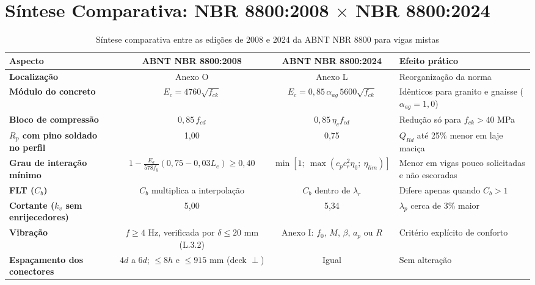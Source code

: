 \section{Síntese Comparativa: NBR 8800:2008 \ensuremath{\times} NBR 8800:2024}\label{sec:2.10}

\begin{table}[htbp]
  \centering
  \caption{Síntese comparativa entre as edições de 2008 e 2024 da ABNT NBR 8800 para vigas mistas}\label{tab:comparativo-edicoes}
  {\footnotesize
  \renewcommand{\arraystretch}{1.3}
  \begin{tabularx}{\textwidth}{@{}>{\raggedright\arraybackslash}p{2.6cm}CCL@{}}
  \toprule
  Aspecto & ABNT NBR 8800:2008 & ABNT NBR 8800:2024 & Efeito prático \\
  \midrule
  \textbf{Localização} & Anexo O & Anexo L & Reorganização da norma \\
  \textbf{Módulo do concreto} & $E_c = 4760\sqrt{f_{ck}}$ & $E_c = 0{,}85\,\alpha_{ag}\, 5600\sqrt{f_{ck}}$ & Idênticos para granito e gnaisse ($\alpha_{ag} = 1{,}0$) \\
  \textbf{Bloco de compressão} & $0{,}85\, f_{cd}$ & $0{,}85\,\eta_c f_{cd}$ & Redução só para $f_{ck} > 40$ MPa \\
  \textbf{$R_p$ com pino soldado no perfil} & 1,00 & 0,75 & $Q_{Rd}$ até 25\% menor em laje maciça \\
  \textbf{Grau de interação mínimo} & $1 - \frac{E_a}{578 f_y}(0{,}75 - 0{,}03L_e) \ge 0{,}40$ & $\min[1;\ \max(c_p c_r^2 \eta_0;\ \eta_{lim})]$ & Menor em vigas pouco solicitadas e não escoradas \\
  \textbf{FLT ($C_b$)} & $C_b$ multiplica a interpolação & $C_b$ dentro de $\lambda_r$ & Difere apenas quando $C_b > 1$ \\
  \textbf{Cortante ($k_v$ sem enrijecedores)} & 5,00 & 5,34 & $\lambda_p$ cerca de 3\% maior \\
  \textbf{Vibração} & $f \ge 4$ Hz, verificada por $\delta \le 20$ mm (L.3.2) & Anexo I: $f_0$, $M$, $\beta$, $a_p$ ou $R$ & Critério explícito de conforto \\
  \textbf{Espaçamento dos conectores} & $4d$ a $6d$; $\le 8h$ e $\le 915$ mm (deck \ensuremath{\perp}) & Igual & Sem alteração \\
  \bottomrule
  \end{tabularx}
  }
\end{table}

